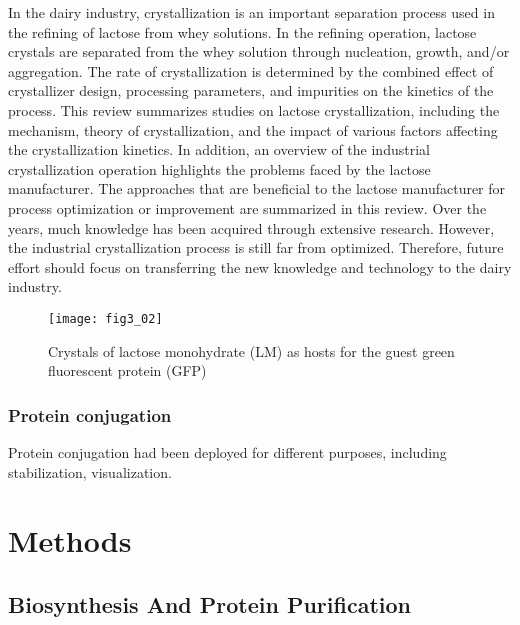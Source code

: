 \begin{refsection}
In the dairy industry, crystallization is an important separation
process used in the refining of lactose from whey solutions. In the refining
operation, lactose crystals are separated from the whey solution through
nucleation, growth, and/or aggregation. The rate of crystallization is
determined by the combined effect of crystallizer design, processing
parameters, and impurities on the kinetics of the process. This review
summarizes studies on lactose crystallization, including the mechanism, theory
of crystallization, and the impact of various factors affecting the
crystallization kinetics. In addition, an overview of the industrial
crystallization operation highlights the problems faced by the lactose
manufacturer. The approaches that are beneficial to the lactose manufacturer
for process optimization or improvement are summarized in this review. Over the
years, much knowledge has been acquired through extensive research. However,
the industrial crystallization process is still far from optimized. Therefore,
future effort should focus on transferring the new knowledge and technology to
the dairy industry.

\begin{figure}[h!] \centering \texttt{[image: fig3\_02]} 
    \caption[Crystals of lactose monohydrate (LM) as hosts for the guest green
    fluorescent protein (GFP)]{Crystals of lactose monohydrate (LM) as hosts
    for the guest green fluorescent protein (GFP)}
    \label{fig:lm-intro}
\end{figure}

\subsubsection{Protein conjugation}

Protein conjugation had been deployed for different purposes, including
stabilization, visualization. 

\section{Methods}

\subsection{Biosynthesis And Protein Purification}


\end{refsection}
